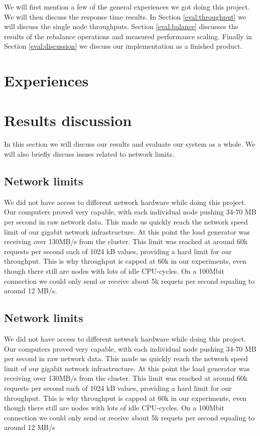 
We will first mention a few of the general experiences we got doing this project.
We will then discuss the response time results. In Section \ref{eval:throughput} we will discuss the single node throughputs.
Section \ref{eval:balance} discusses the results of the rebalance operations and measured performance scaling. Finally in Section \ref{eval:discussion} we discuss our implementation as a finished product. 

\section{Experiences}

\section{Results discussion}
In this section we will discuss our results and evaluate our system as a whole. We will also briefly discuss issues related to network limits.  

\subsection{Network limits}
We did not have access to different network hardware while doing this project. Our computers proved very capable, with each individual node pushing 34-70 MB per second in raw network data. This made us quickly reach the network speed limit of our gigabit network infrastructure. At this point the load generator was receiving over 130MB/s from the cluster. This limit was reached at around 60k requests per second each of 1024 kB values, providing a hard limit for our throughput. This is why throughput is capped at 60k in our experiments, even though there still are nodes with lots of idle CPU-cycles. On a 100Mbit connection we could only send or receive about 5k requets per second equaling to around 12 MB/s.

\subsection{Network limits}
We did not have access to different network hardware while doing this project. Our computers proved very capable, with each individual node pushing 34-70 MB per second in raw network data. This made us quickly reach the network speed limit of our gigabit network infrastructure. At this point the load generator was receiving over 130MB/s from the cluster. This limit was reached at around 60k requests per second each of 1024 kB values, providing a hard limit for our throughput. This is why throughput is capped at 60k in our experiments, even though there still are nodes with lots of idle CPU-cycles. On a 100Mbit connection we could only send or receive about 5k requets per second equaling to around 12 MB/s

